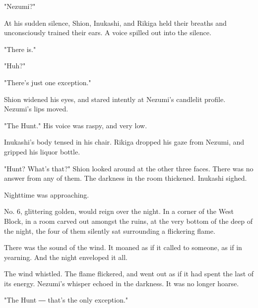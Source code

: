 "Nezumi?"

At his sudden silence, Shion, Inukashi, and Rikiga held their breaths
and unconsciously trained their ears. A voice spilled out into the
silence.

"There is."

"Huh?"

"There's just one exception."

Shion widened his eyes, and stared intently at Nezumi's candlelit
profile. Nezumi's lips moved.

"The Hunt." His voice was raspy, and very low.

Inukashi's body tensed in his chair. Rikiga dropped his gaze from
Nezumi, and gripped his liquor bottle.

"Hunt? What's that?" Shion looked around at the other three faces. There
was no answer from any of them. The darkness in the room thickened.
Inukashi sighed.

Nighttime was approaching.

No. 6, glittering golden, would reign over the night. In a corner of the
West Block, in a room carved out amongst the ruins, at the very bottom
of the deep of the night, the four of them silently sat surrounding a
flickering flame.

There was the sound of the wind. It moaned as if it called to someone,
as if in yearning. And the night enveloped it all.

The wind whistled. The flame flickered, and went out as if it had spent
the last of its energy. Nezumi's whisper echoed in the darkness. It was
no longer hoarse.

"The Hunt ― that's the only exception."